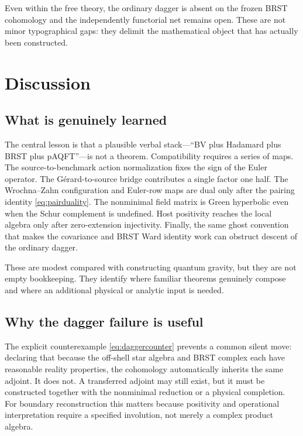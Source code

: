 \documentclass[11pt]{article}
\theoremstyle{definition}
\theoremstyle{remark}
\begin{document}
Even within the free theory, the ordinary dagger is absent on the frozen BRST
cohomology and the independently functorial net remains open.  These are not minor
typographical gaps: they delimit the mathematical object that has actually been
constructed.

\section{Discussion}

\subsection{What is genuinely learned}

The central lesson is that a plausible verbal stack---``BV plus Hadamard plus BRST
plus pAQFT''---is not a theorem.  Compatibility requires a series of maps.  The
source-to-benchmark action normalization fixes the sign of the Euler operator.  The
G\'erard-to-source bridge contributes a single factor one half.  The Wrochna--Zahn
configuration and Euler-row maps are dual only after the pairing identity
\cref{eq:pairduality}.  The nonminimal field matrix is Green hyperbolic even when the
Schur complement is undefined.  Host positivity reaches the local algebra only after
zero-extension injectivity.  Finally, the same ghost convention that makes the
covariance and BRST Ward identity work can obstruct descent of the ordinary dagger.

These are modest compared with constructing quantum gravity, but they are not empty
bookkeeping.  They identify where familiar theorems genuinely compose and where an
additional physical or analytic input is needed.

\subsection{Why the dagger failure is useful}

The explicit counterexample \cref{eq:daggercounter} prevents a common silent move:
declaring that because the off-shell star algebra and BRST complex each have reasonable
reality properties, the cohomology automatically inherits the same adjoint.  It does
not.  A transferred adjoint may still exist, but it must be constructed together with
the nonminimal reduction or a physical completion.  For boundary reconstruction this
matters because positivity and operational interpretation require a specified
involution, not merely a complex product algebra.
\end{document}
